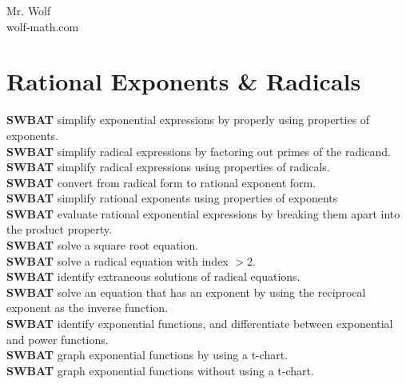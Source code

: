 \documentclass[12pt]{article}
\begin{document}
\setcounter{secnumdepth}{-1}

Mr. Wolf \\ wolf-math.com

\newcommand{\random}{\rand\arabic{rand}}

\section{Rational Exponents \& Radicals}



\textbf{SWBAT} simplify exponential expressions by properly using properties of exponents.\\

\textbf{SWBAT} simplify radical expressions by factoring out primes of the radicand.\\
	
\textbf{SWBAT} simplify radical expressions using properties of radicals.\\

\textbf{SWBAT} convert from radical form to rational exponent form.\\
	
\textbf{SWBAT} simplify rational exponents using properties of exponents\\
	
\textbf{SWBAT} evaluate rational exponential expressions by breaking them apart into the product property.\\
	
\textbf{SWBAT} solve a square root equation.\\

\textbf{SWBAT} solve a radical equation with index $>2$.\\

\textbf{SWBAT} identify extraneous solutions of radical equations.\\

\textbf{SWBAT} solve an equation that has an exponent by using the reciprocal exponent as the inverse function.\\

\textbf{SWBAT} identify exponential functions, and differentiate between exponential and power functions.\\

\textbf{SWBAT} graph exponential functions by using a t-chart.\\

\textbf{SWBAT} graph exponential functions without using a t-chart.\\
\end{document}
